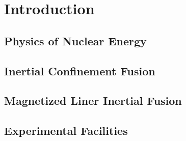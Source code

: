 \chapter{Introduction}

    
	
	\section{Physics of Nuclear Energy}
	\label{sec:PhysicsofNuclearEnergy}
	
	
	\section{Inertial Confinement Fusion}
	\label{sec:ICF}
	
	
	\section{Magnetized Liner Inertial Fusion}
	\label{sec:magLIF}
	
	
	\section{Experimental Facilities}
	\label{sec:ExperimentalFacilities}
	

	\begin{singlespace}
	    \begin{flushleft}
	        
		    
	    \end{flushleft}
	\end{singlespace}
	
	
	
	
	
